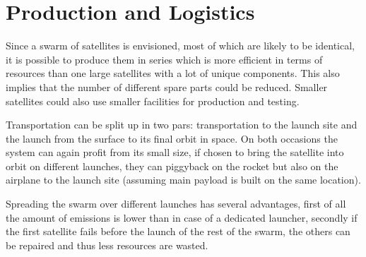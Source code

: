 \section{Production and Logistics}
\label{blSSPRO}

Since a swarm of satellites is envisioned, most of which are likely to be identical, it is possible to produce them in series which is more efficient in terms of resources than one large satellites with a lot of unique components. This also implies that the number of different spare parts could be reduced. Smaller satellites could also use smaller facilities for production and testing. 

Transportation can be split up in two pars: transportation to the launch site and the launch from the surface to its final orbit in space. On both occasions the system can again profit from its small size, if chosen to bring the satellite into orbit on different launches, they can piggyback on the rocket but also on the airplane to the launch site (assuming main payload is built on the same location).

Spreading the swarm over different launches has several advantages, first of all the amount of emissions is lower than in case of a dedicated launcher, secondly if the first satellite fails before the launch of the rest of the swarm, the others can be repaired and thus less resources are wasted.